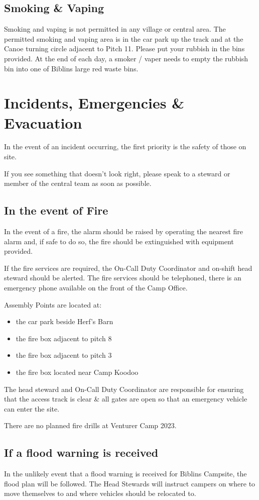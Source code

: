 \documentclass[a4paper, 11pt]{report}
\begin{document}
\section{Smoking \& Vaping}
Smoking and vaping is not permitted in any village or central area. The permitted smoking and vaping area is in the car park up the track and at the Canoe turning circle adjacent to Pitch 11. Please put your rubbish in the bins provided. At the end of each day, a smoker / vaper needs to empty the rubbish bin into one of Biblins large red waste bins.

\chapter{Incidents, Emergencies \& Evacuation}
In the event of an incident occurring, the first priority is the safety of those on site.\nl

If you see something that doesn't look right, please speak to a steward or member of the central team as soon as possible.

\section{In the event of Fire}
In the event of a fire, the alarm should be raised by operating the nearest fire alarm and, if safe to do so, the fire should be extinguished with equipment provided.\nl

If the fire services are required, the On-Call Duty Coordinator and on-shift head steward should be alerted. The fire services should be telephoned, there is an emergency phone available on the front of the Camp Office.\nl

Assembly Points are located at:
\begin{itemize}
    \item the car park beside Herf's Barn
    \item the fire box adjacent to pitch 8
    \item the fire box adjacent to pitch 3
    \item the fire box located near Camp Koodoo
\end{itemize}

The head steward and On-Call Duty Coordinator are responsible for ensuring that the access track is clear \& all gates are open so that an emergency vehicle can enter the site.\nl

There are no planned fire drills at Venturer Camp 2023.

\section{If a flood warning is received}
In the unlikely event that a flood warning is received for Biblins Campsite, the flood plan will be followed. The Head Stewards will instruct campers on where to move themselves to and where vehicles should be relocated to.\nl
\end{document}
